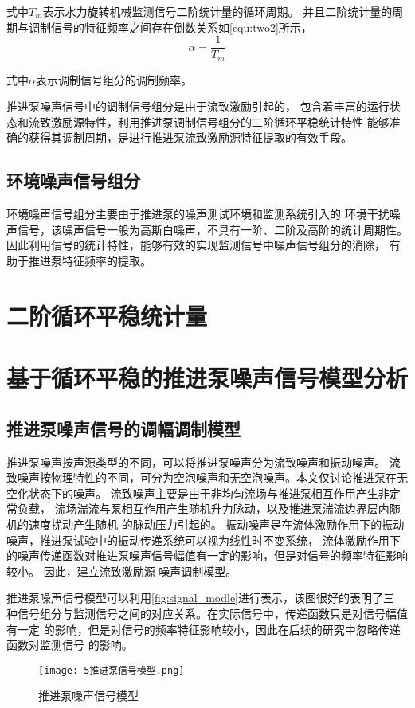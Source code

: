 式中$T_m$表示水力旋转机械监测信号二阶统计量的循环周期。
并且二阶统计量的周期与调制信号的特征频率之间存在倒数关系如\autoref{equ:two2}所示，
\begin{equation}
    \label{equ:two2}
    \alpha =\frac{1}{T_{m} } 
\end{equation}

式中$\alpha$表示调制信号组分的调制频率。 

推进泵噪声信号中的调制信号组分是由于流致激励引起的，
包含着丰富的运行状态和流致激励源特性，利用推进泵调制信号组分的二阶循环平稳统计特性
能够准确的获得其调制周期，是进行推进泵流致激励源特征提取的有效手段。
\subsection{环境噪声信号组分}
环境噪声信号组分主要由于推进泵的噪声测试环境和监测系统引入的
环境干扰噪声信号，该噪声信号一般为高斯白噪声，不具有一阶、二阶及高阶的统计周期性。
因此利用信号的统计特性，能够有效的实现监测信号中噪声信号组分的消除，
有助于推进泵特征频率的提取。

\section{二阶循环平稳统计量}

\section{基于循环平稳的推进泵噪声信号模型分析}
\subsection{推进泵噪声信号的调幅调制模型}
推进泵噪声按声源类型的不同，可以将推进泵噪声分为流致噪声和振动噪声。
流致噪声按物理特性的不同，可分为空泡噪声和无空泡噪声。本文仅讨论推进泵在无空化状态下的噪声。
流致噪声主要是由于非均匀流场与推进泵相互作用产生非定常负载，
流场湍流与泵相互作用产生随机升力脉动，以及推进泵湍流边界层内随机的速度扰动产生随机
的脉动压力引起的。
振动噪声是在流体激励作用下的振动噪声，推进泵试验中的振动传递系统可以视为线性时不变系统，
流体激励作用下的噪声传递函数对推进泵噪声信号幅值有一定的影响，但是对信号的频率特征影响较小。
因此，建立流致激励源-噪声调制模型。

推进泵噪声信号模型可以利用\autoref{fig:signal_modle}进行表示，该图很好的表明了三
种信号组分与监测信号之间的对应关系。在实际信号中，传递函数只是对信号幅值有一定
的影响，但是对信号的频率特征影响较小，因此在后续的研究中忽略传递函数对监测信号
的影响。
\begin{figure}[htbp]
    \centering
    \texttt{[image: 5推进泵信号模型.png]}
    \caption{\label{fig:signal_modle}推进泵噪声信号模型}
\end{figure}

